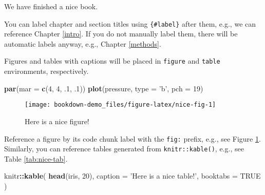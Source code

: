 \documentclass[]{book}
\newenvironment{Shaded}{\begin{snugshade}}{\end{snugshade}}
\newcommand{\DataTypeTok}[1]{\textcolor[rgb]{0.13,0.29,0.53}{#1}}
\newcommand{\DecValTok}[1]{\textcolor[rgb]{0.00,0.00,0.81}{#1}}
\newcommand{\FloatTok}[1]{\textcolor[rgb]{0.00,0.00,0.81}{#1}}
\newcommand{\KeywordTok}[1]{\textcolor[rgb]{0.13,0.29,0.53}{\textbf{#1}}}
\newcommand{\NormalTok}[1]{#1}
\newcommand{\OperatorTok}[1]{\textcolor[rgb]{0.81,0.36,0.00}{\textbf{#1}}}
\newcommand{\OtherTok}[1]{\textcolor[rgb]{0.56,0.35,0.01}{#1}}
\newcommand{\StringTok}[1]{\textcolor[rgb]{0.31,0.60,0.02}{#1}}
\theoremstyle{definition}
\theoremstyle{definition}
\theoremstyle{definition}
\theoremstyle{remark}
\begin{document}
We have finished a nice book.

You can label chapter and section titles using \texttt{\{\#label\}}
after them, e.g., we can reference Chapter \ref{intro}. If you do not
manually label them, there will be automatic labels anyway, e.g.,
Chapter \ref{methods}.

Figures and tables with captions will be placed in \texttt{figure} and
\texttt{table} environments, respectively.

\begin{Shaded}
\begin{Highlighting}[]
\KeywordTok{par}\NormalTok{(}\DataTypeTok{mar =} \KeywordTok{c}\NormalTok{(}\DecValTok{4}\NormalTok{, }\DecValTok{4}\NormalTok{, }\FloatTok{.1}\NormalTok{, }\FloatTok{.1}\NormalTok{))}
\KeywordTok{plot}\NormalTok{(pressure, }\DataTypeTok{type =} \StringTok{'b'}\NormalTok{, }\DataTypeTok{pch =} \DecValTok{19}\NormalTok{)}
\end{Highlighting}
\end{Shaded}

\begin{figure}

{\centering \texttt{[image: bookdown-demo\_files/figure-latex/nice-fig-1]} 

}

\caption{Here is a nice figure!}\label{fig:nice-fig}
\end{figure}

Reference a figure by its code chunk label with the \texttt{fig:}
prefix, e.g., see Figure \ref{fig:nice-fig}. Similarly, you can
reference tables generated from \texttt{knitr::kable()}, e.g., see Table
\ref{tab:nice-tab}.

\begin{Shaded}
\begin{Highlighting}[]
\NormalTok{knitr}\OperatorTok{::}\KeywordTok{kable}\NormalTok{(}
  \KeywordTok{head}\NormalTok{(iris, }\DecValTok{20}\NormalTok{), }\DataTypeTok{caption =} \StringTok{'Here is a nice table!'}\NormalTok{,}
  \DataTypeTok{booktabs =} \OtherTok{TRUE}
\NormalTok{)}
\end{Highlighting}
\end{Shaded}
\end{document}
